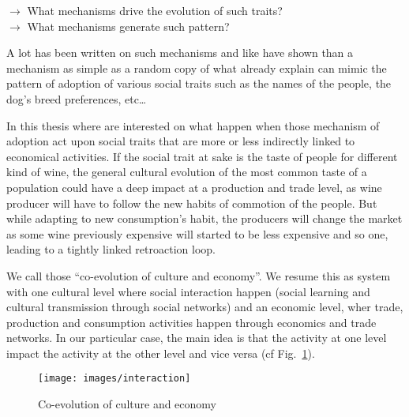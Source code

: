 \documentclass[a4paper]{article}
\begin{document}
\begin{minipage}{\textwidth}
    $\rightarrow$ What mechanisms drive the evolution of such traits?\\
    $\rightarrow$ What mechanisms generate such pattern?
\end{minipage}
\vspace{.5cm}

A lot has been written on such mechanisms and like \cite{bentley2005specialisationandwealthinequalityinamodelofaclusteredeconomicnetwork} have shown than a mechanism as simple as a random copy of what already explain can mimic the pattern of adoption of various social traits such as the names of the people, the dog's breed preferences, etc\ldots  

%
In this thesis where are interested on what happen when those mechanism of adoption act upon social traits that are more or less indirectly linked to economical activities. If the social trait at sake is the taste of people for different kind of wine, the general cultural evolution of the most common taste of a population could have a deep impact at a production and trade level, as wine producer will have to follow the new habits of commotion of the people. But while adapting to new consumption's habit, the producers will change the market as some wine previously expensive will started to be less expensive and so one, leading to a tightly linked retroaction loop.

We call those ``co-evolution of culture and economy''. We resume this as system with one cultural level where social interaction happen (social learning and cultural transmission through social networks) and an economic level, wher trade, production and consumption activities happen through economics and trade networks. In our particular case, the main idea is that the activity at one level impact the activity at the other level and vice versa (cf Fig.~\ref{fig:inter}). 

\begin{figure}[ht]
    \centering
    \texttt{[image: images/interaction]}	
    \caption{Co-evolution of culture and economy}
    \label{fig:inter}
\end{figure}
\end{document}
